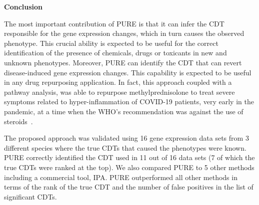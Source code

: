 \textbf{Conclusion}

The most important contribution of PURE is that it can infer the CDT responsible for the gene expression changes, which in turn causes the observed phenotype. This crucial ability is expected to be useful for the correct identification of the presence of chemicals, drugs or toxicants in new and unknown phenotypes.  Moreover, PURE can identify the CDT that can revert disease-induced gene expression changes. This capability is expected to be useful in any drug repurposing application. In fact, this approach coupled with a pathway analysis, was able to repurpose methylprednisolone to treat severe symptoms related to hyper-inflammation of COVID-19 patients, very early in the pandemic, at a time when the WHO's recommendation was against the use of steroids~\cite{DraghiciCOVID:2021}.
 
The proposed approach was validated using 16 gene expression data sets from 3 different species where the true CDTs that caused the phenotypes were known. PURE correctly identified the CDT used in 11 out of 16 data sets (7 of which the true CDTs were ranked at the top). We also compared PURE to 5 other methods including a commercial tool, IPA. PURE outperformed all other methods in terms of the rank of the true CDT and the number of false positives in the list of significant CDTs.




%
% 
